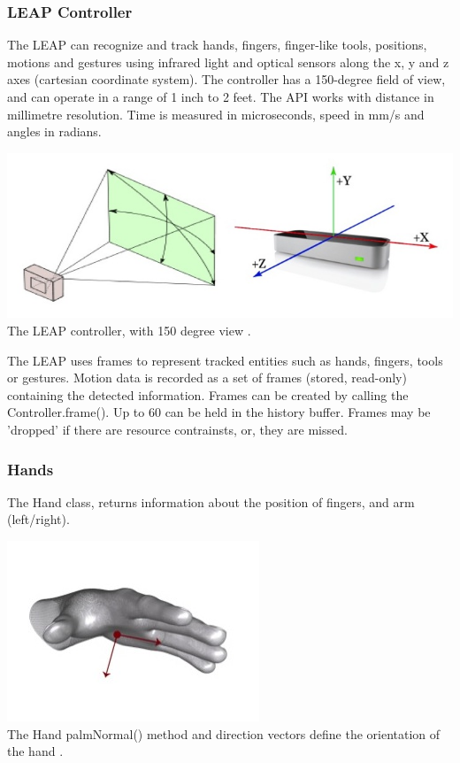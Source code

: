 \documentclass[a4paper, 10pt]{article}
\begin{document}
\subsubsection{LEAP Controller}
The LEAP can recognize and track hands, fingers, finger-like tools, positions, motions and gestures using infrared light and optical sensors along the x, y and z axes (cartesian coordinate system). The controller has a 150-degree field of view, and can operate in a range of 1 inch to 2 feet. The API works with distance in millimetre resolution. Time is measured in microseconds, speed in mm/s and angles in radians.

\begin{center}
\includegraphics[scale=0.4]{leap}\\
The LEAP controller, with 150 degree view \cite{leap}.
\end{center}

The LEAP uses frames to represent tracked entities such as hands, fingers, tools or gestures. Motion data is recorded as a set of frames (stored, read-only) containing the detected information. Frames can be created by calling the Controller.frame(). Up to 60 can be held in the history buffer. Frames may be 'dropped' if there are resource contrainsts, or, they are missed.

\subsubsection{Hands}
The Hand class, returns information about the position of fingers, and arm (left/right).

\begin{center}
\includegraphics[scale=0.4]{palm}\\
The Hand palmNormal() method and direction vectors define the orientation of the hand \cite{leap}.
\end{center}
\end{document}
